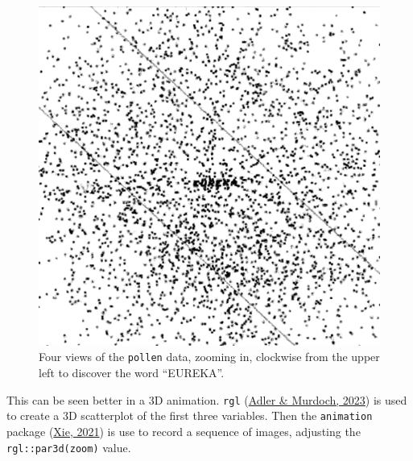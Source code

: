 \documentclass[
  letterpaper,
  10pt,
  krantz2]{krantz}
\begin{document}
\begin{figure}
\begin{minipage}[t]{0.50\linewidth}
{{\includegraphics{images/pollen-eureka3.png}

}

}

\end{minipage}%

\caption{\label{fig-pollen-eureka}Four views of the \texttt{pollen}
data, zooming in, clockwise from the upper left to discover the word
``EUREKA''.}

\end{figure}

This can be seen better in a 3D animation. \texttt{rgl}
(\protect\hyperlink{ref-R-rgl}{Adler \& Murdoch, 2023}) is used to
create a 3D scatterplot of the first three variables. Then the
\texttt{animation} package (\protect\hyperlink{ref-R-animation}{Xie,
2021}) is use to record a sequence of images, adjusting the
\texttt{rgl::par3d(zoom)} value.
\end{document}
